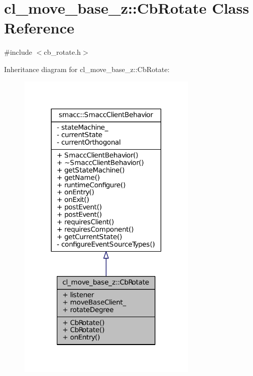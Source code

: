 \hypertarget{classcl__move__base__z_1_1CbRotate}{}\section{cl\+\_\+move\+\_\+base\+\_\+z\+:\+:Cb\+Rotate Class Reference}
\label{classcl__move__base__z_1_1CbRotate}


{\ttfamily \#include $<$cb\+\_\+rotate.\+h$>$}



Inheritance diagram for cl\+\_\+move\+\_\+base\+\_\+z\+:\+:Cb\+Rotate\+:
\nopagebreak
\begin{figure}[H]
\begin{center}
\leavevmode
\includegraphics[width=242pt]{classcl__move__base__z_1_1CbRotate__inherit__graph}
\end{center}
\end{figure}


